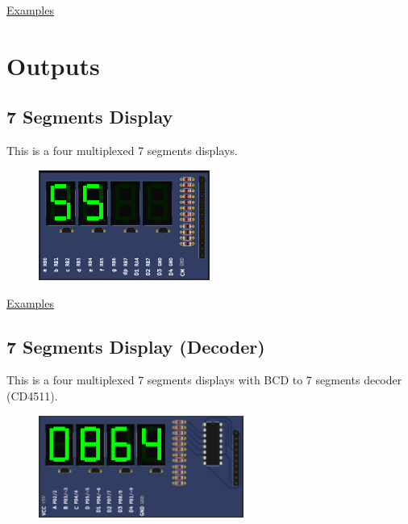 \href{https://lcgamboa.github.io/picsimlab_examples/Parts.html\#Ultrasonic_HC-SR04}{Examples}



\section{Outputs}

\subsection{7 Segments Display}

This is a four multiplexed 7 segments displays.

\begin{figure}[H]
\center
\includegraphics[width=0.5\textwidth]{img/part_7seg.png} 
\end{figure} 

\href{https://lcgamboa.github.io/picsimlab_examples/Parts.html\#7_Segments_Display}{Examples}

\subsection{7 Segments Display (Decoder)}

This is a four multiplexed 7 segments displays with BCD to 7 segments decoder (CD4511).

\begin{figure}[H]
\center
\includegraphics[width=0.6\textwidth]{img/part_7seg_dec.png} 
\end{figure} 

